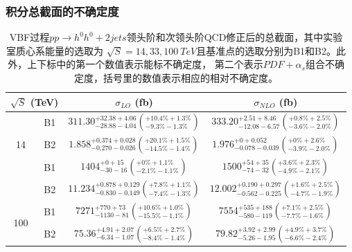 \subsubsection{积分总截面的不确定度}
\begin{table}
  \centering 
  \begin{tabular}{|c|c|c|c|}
  \hline\hline
  \multicolumn{2}{|c|}{$\sqrt{S}$ (TeV)} & $\sigma_{LO}$ (fb) & $\sigma_{NLO}$ (fb) \\
  \hline
  \multirow{3}{*}{14}  & B1 &
   $311.30^{+32.38 +4.06}_{-28.88-4.04} \left( ^{+ 10.4 \% + 1.3 \%}_{-9.3 \% - 1.3 \%} \right)$ &
   $333.20^{+2.51 +8.46}_{-12.08-6.57} \left( ^{+ 0.8 \% + 2.5 \%}_{-3.6 \% - 2.0 \%} \right)$ \\
   & B2 &
   $1.858^{+0.374 +0.028}_{-0.270-0.026} \left( ^{+ 20.1 \% + 1.5 \%}_{-14.5 \% - 1.4 \%} \right)$ &
   $1.976^{+0 +0.052}_{-0.078-0.039} \left( ^{+ 0 \% + 2.6 \%}_{-3.9 \% - 2.0 \%} \right)$ \\
   \hline
   \multirow{3}{*}{33}  & B1 &
   $1404^{+0 +15}_{-30-16} \left( ^{+ 0 \% + 1.1 \%}_{-2.1 \% - 1.1 \%} \right)$ &
   $1500^{+54 +35}_{-74-32} \left( ^{+ 3.6 \% + 2.3 \%}_{-4.9 \% - 2.1 \%} \right)$ \\
   & B2 &
   $11.234^{+0.878 +0.129}_{-0.830-0.149} \left( ^{+ 7.8 \% + 1.1 \%}_{-7.4 \% - 1.3 \%} \right)$ &
   $12.002^{+0.190 +0.297}_{-0.562-0.225} \left( ^{+ 1.6 \% + 2.5 \%}_{-4.7 \% - 1.9 \%} \right)$ \\
   \hline
   \multirow{3}{*}{100}  & B1 &
   $7271^{+770 +73}_{-1130-81} \left( ^{+ 10.6 \% + 1.0 \%}_{-15.5 \% - 1.1 \%} \right)$ &
   $7554^{+535 +188}_{-580-119} \left( ^{+ 7.1 \% + 2.5 \%}_{-7.7 \% - 1.6 \%} \right)$ \\
   & B2 &
   $75.36^{+4.91 +2.07}_{-6.34-1.07} \left( ^{+ 6.5 \% + 2.7 \%}_{-8.4 \% - 1.4 \%} \right)$ &
   $79.82^{+3.92 +2.99}_{-5.26-1.95} \left( ^{+ 4.9 \% + 3.7 \%}_{-6.6 \% - 2.4 \%} \right)$ \\
   \hline \hline
  \end{tabular}
\caption{VBF过程$pp\to h^0h^0+2jets$领头阶和次领头阶QCD修正后的总截面，其中实验室质心系能量的选取为
$\sqrt{S} = 14,33,100~TeV$且基准点的选取分别为B1和B2。此外，上下标中的第一个数值表示能标不确定度，
第二个表示$PDF+\alpha_s$组合不确定度，括号里的数值表示相应的相对不确定度。}
\label{tab:x-ppcolliders1}
\end{table}

